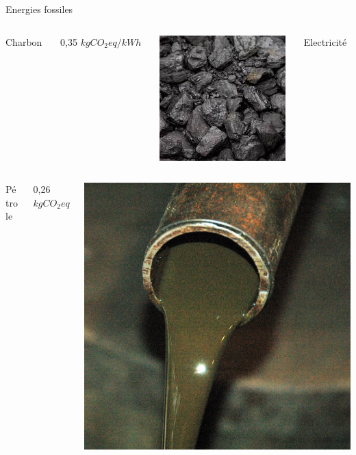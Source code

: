 \documentclass{beamer}
\begin{document}
\begin{frame}{Energies fossiles}

\begin{columns}
  \begin{column}{0.15\textwidth}
Charbon
\end{column}
\begin{column}{0.3\textwidth}
0,35 $kgCO_2 eq/kWh$
\end{column}
\begin{column}{0.25\textwidth}
  \includegraphics[scale=0.37]{images/charbon.jpeg}
\end{column}
\begin{column}{0.15\textwidth}
Electricité
\end{column}
\end{columns}
\vspace{0.3cm}
\begin{columns}
  \begin{column}{0.15\textwidth}
Pétrole
\end{column}
\begin{column}{0.3\textwidth}
0,26 $kgCO_2 eq/kWh$
\end{column}
\begin{column}{0.25\textwidth}
  \includegraphics[scale=0.08]{images/petrole.jpg}

\end{column}
\end{columns}
\end{frame}
\end{document}
